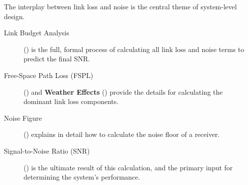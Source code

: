 \begin{importantbox}[title={Further Reading}]
    The interplay between link loss and noise is the central theme of system-level design.
    \begin{description}
        \item[Link Budget Analysis] () is the full, formal process of calculating all link loss and noise terms to predict the final SNR.
        \item[Free-Space Path Loss (FSPL)] () and \textbf{Weather Effects} () provide the details for calculating the dominant link loss components.
        \item[Noise Figure] () explains in detail how to calculate the noise floor of a receiver.
        \item[Signal-to-Noise Ratio (SNR)] () is the ultimate result of this calculation, and the primary input for determining the system's performance.
    \end{description}
\end{importantbox}
